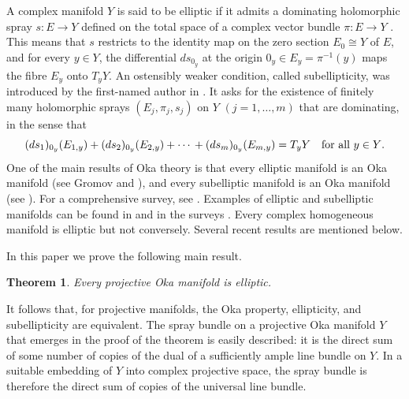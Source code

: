 \documentclass[12pt]{amsart}
\newtheorem{theorem}{Theorem}[section]
\theoremstyle{definition}
\numberwithin{equation}{section}
\numberwithin{figure}{section}
\numberwithin{equation}{section}
\begin{document}
A complex manifold $Y$ is said to be elliptic if it admits
a dominating holomorphic spray $s:E\to Y$ defined on the
total space of a complex vector bundle $\pi:E\to Y$
\cite[0.5, p.\ 855]{Gromov1989}. 
This means that $s$ restricts to the identity map on the zero 
section $E_0\cong Y$ of $E$, and for every $y\in Y$, the differential
$ds_{0_y}$ at the origin $0_y\in E_y=\pi^{-1}(y)$ maps 
the fibre $E_y$ onto $T_yY$.
An ostensibly weaker condition, called subellipticity, was 
introduced by the first-named author in \cite[Definition 2]{Forstneric2002MZ}.
It asks for the existence of finitely many holomorphic
sprays $(E_j,\pi_j,s_j)$ on $Y$ $(j=1,\ldots,m)$ that are dominating, 
in the sense that
\begin{equation}
\label{eqn:domination}
    (ds_1)_{0_y}(E_{1,y}) + (ds_2)_{0_y}(E_{2,y})+\cdots\\
                     + (ds_m)_{0_y}(E_{m,y})= T_y Y
                     \quad \text{for all $y\in Y$}.
\end{equation}
One of the main results of Oka theory is that every  
elliptic manifold is an Oka manifold 
(see Gromov \cite[0.6, p.\ 855]{Gromov1989}
and \cite{ForstnericPrezelj2000}), and every subelliptic 
manifold is an Oka manifold (see \cite[Theorem 1.1]{Forstneric2002MZ}). 
For a comprehensive survey, see \cite[Chap.\ 5]{Forstneric2017E}.
Examples of elliptic and subelliptic manifolds can be found 
in \cite[Sect.\ 6.4]{Forstneric2017E} and in the surveys \cite{Forstneric2023Indag,Forstneric2013KAWA,ForstnericLarusson2011}.
Every complex homogeneous manifold
is elliptic but not conversely.  Several recent results are mentioned below.

In this paper we prove the following main result.

%
%
\begin{theorem}\label{th:elliptic}
Every projective Oka manifold is elliptic.
\end{theorem}

It follows that, for projective manifolds, the Oka property, ellipticity, and subellipticity are equivalent.
The spray bundle on a projective Oka manifold $Y$ that emerges in the proof of the theorem is easily described: it is the direct sum of some number of copies of the dual of a sufficiently ample line bundle on $Y$.  In a suitable embedding of $Y$ into complex projective space, the spray bundle is therefore the direct sum of copies of the universal line bundle.
\end{document}
